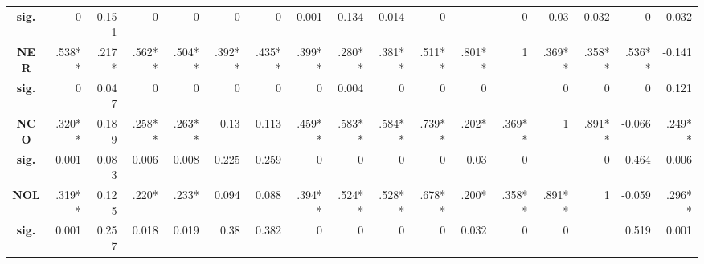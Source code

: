 \documentclass[conference]{IEEEtran}
\begin{document}
\begin{table}[]
{\begin{tabular}{|c|rrrrrr|rrrr|rrrrrr|}
      \textbf{sig.} & 0 & 0.151 & 0 & 0 & 0 & 0 & 0.001 & 0.134 & 0.014 & 0 &  & 0 & 0.03 & 0.032 & 0 & 0.032 \\
      \textbf{NER} & \cellcolor[HTML]{EFEFEF}.538** & .217* & \cellcolor[HTML]{EFEFEF}.562** & \cellcolor[HTML]{EFEFEF}.504** & \cellcolor[HTML]{EFEFEF}.392** & \cellcolor[HTML]{EFEFEF}.435** & \cellcolor[HTML]{EFEFEF}.399** & \cellcolor[HTML]{EFEFEF}.280** & \cellcolor[HTML]{EFEFEF}.381** & \cellcolor[HTML]{EFEFEF}.511** & \cellcolor[HTML]{EFEFEF}.801** & 1 & \cellcolor[HTML]{EFEFEF}.369** & \cellcolor[HTML]{EFEFEF}.358** & \cellcolor[HTML]{EFEFEF}.536** & -0.141 \\
      \textbf{sig.} & \cellcolor[HTML]{EFEFEF}0 & 0.047 & \cellcolor[HTML]{EFEFEF}0 & \cellcolor[HTML]{EFEFEF}0 & \cellcolor[HTML]{EFEFEF}0 & \cellcolor[HTML]{EFEFEF}0 & \cellcolor[HTML]{EFEFEF}0 & \cellcolor[HTML]{EFEFEF}0.004 & \cellcolor[HTML]{EFEFEF}0 & \cellcolor[HTML]{EFEFEF}0 & \cellcolor[HTML]{EFEFEF}0 &  & \cellcolor[HTML]{EFEFEF}0 & \cellcolor[HTML]{EFEFEF}0 & \cellcolor[HTML]{EFEFEF}0 & 0.121 \\
      \textbf{NCO} & \cellcolor[HTML]{EFEFEF}.320** & 0.189 & \cellcolor[HTML]{EFEFEF}.258** & \cellcolor[HTML]{EFEFEF}.263** & 0.13 & 0.113 & \cellcolor[HTML]{EFEFEF}.459** & \cellcolor[HTML]{EFEFEF}.583** & \cellcolor[HTML]{EFEFEF}.584** & \cellcolor[HTML]{EFEFEF}.739** & \cellcolor[HTML]{EFEFEF}.202* & \cellcolor[HTML]{EFEFEF}.369** & 1 & \cellcolor[HTML]{EFEFEF}.891** & -0.066 & \cellcolor[HTML]{EFEFEF}.249** \\
      \textbf{sig.} & \cellcolor[HTML]{EFEFEF}0.001 & 0.083 & \cellcolor[HTML]{EFEFEF}0.006 & \cellcolor[HTML]{EFEFEF}0.008 & 0.225 & 0.259 & \cellcolor[HTML]{EFEFEF}0 & \cellcolor[HTML]{EFEFEF}0 & \cellcolor[HTML]{EFEFEF}0 & \cellcolor[HTML]{EFEFEF}0 & \cellcolor[HTML]{EFEFEF}0.03 & \cellcolor[HTML]{EFEFEF}0 &  & \cellcolor[HTML]{EFEFEF}0 & 0.464 & \cellcolor[HTML]{EFEFEF}0.006 \\
      \textbf{NOL} & \cellcolor[HTML]{EFEFEF}.319** & 0.125 & \cellcolor[HTML]{EFEFEF}.220* & \cellcolor[HTML]{EFEFEF}.233* & 0.094 & 0.088 & \cellcolor[HTML]{EFEFEF}.394** & \cellcolor[HTML]{EFEFEF}.524** & \cellcolor[HTML]{EFEFEF}.528** & \cellcolor[HTML]{EFEFEF}.678** & \cellcolor[HTML]{EFEFEF}.200* & \cellcolor[HTML]{EFEFEF}.358** & \cellcolor[HTML]{EFEFEF}.891** & 1 & -0.059 & \cellcolor[HTML]{EFEFEF}.296** \\
      \textbf{sig.} & \cellcolor[HTML]{EFEFEF}0.001 & 0.257 & \cellcolor[HTML]{EFEFEF}0.018 & \cellcolor[HTML]{EFEFEF}0.019 & 0.38 & 0.382 & \cellcolor[HTML]{EFEFEF}0 & \cellcolor[HTML]{EFEFEF}0 & \cellcolor[HTML]{EFEFEF}0 & \cellcolor[HTML]{EFEFEF}0 & \cellcolor[HTML]{EFEFEF}0.032 & \cellcolor[HTML]{EFEFEF}0 & \cellcolor[HTML]{EFEFEF}0 &  & 0.519 & \cellcolor[HTML]{EFEFEF}0.001 \\

\end{tabular}}
\end{table}
\end{document}
